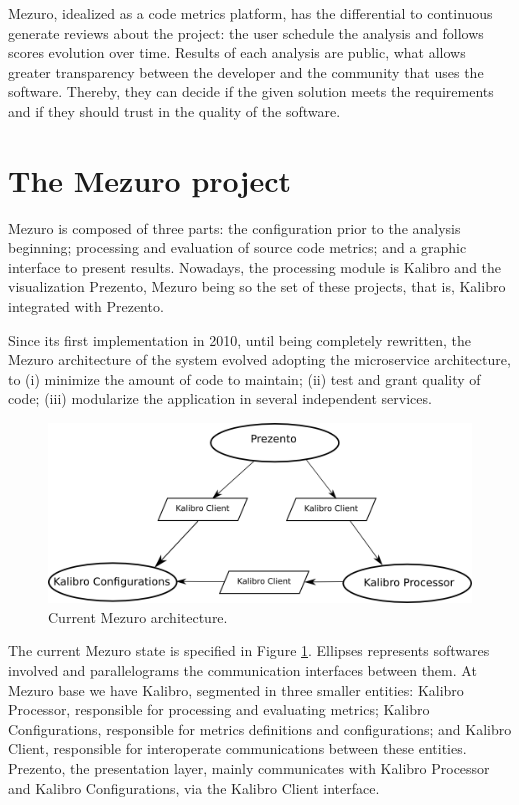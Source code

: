 \documentclass{llncs}
\begin{document}
Mezuro, idealized as a code metrics platform, has the differential to
continuous generate reviews about the project: the user schedule the analysis
and follows scores evolution over time. Results of each analysis are public,
what allows greater transparency between the developer and the community that
uses the software. Thereby, they can decide if the given solution meets the
requirements and if they should trust in the quality of the software.

\section{The Mezuro project}
\label{sec:mezuro}

Mezuro is composed of three parts: the configuration prior to the analysis
beginning; processing and evaluation of source code metrics; and a graphic
interface to present results. Nowadays, the processing module is Kalibro and
the visualization Prezento, Mezuro being so the set of these projects, that is,
Kalibro integrated with Prezento.

Since its first implementation in 2010\cite{mezuro2012}, until being completely
rewritten, the Mezuro architecture of the system evolved adopting the
microservice architecture\cite{namiot2014micro}, to (i) minimize the amount of
code to maintain; (ii) test and grant quality of code; (iii) modularize the
application in several independent services.

\begin{figure}[hbt]
  \centering
    \includegraphics[width=.8\linewidth]{images/mezuro-architecturev3.png}
  \caption{Current Mezuro architecture.}
  \label{fig:architecture-2}
\end{figure}


The current Mezuro state is specified in Figure \ref{fig:architecture-2}.
Ellipses represents softwares involved and parallelograms the communication
interfaces between them. At Mezuro base we have Kalibro, segmented in three
smaller entities: Kalibro Processor, responsible for processing and evaluating
metrics; Kalibro Configurations, responsible for metrics definitions and
configurations; and Kalibro Client, responsible for interoperate communications
between these entities.  Prezento, the presentation layer, mainly communicates
with Kalibro Processor and Kalibro Configurations, via the Kalibro Client
interface.
\end{document}
